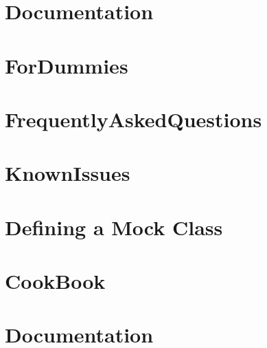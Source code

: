 \documentclass[twoside]{book}
\newcommand{\+}{\discretionary{\mbox{\scriptsize$\hookleftarrow$}}{}{}}
\begin{document}
\chapter{Documentation}
\label{md_vendor_googletest_googlemock_docs__documentation}

\chapter{For\+Dummies}
\label{md_vendor_googletest_googlemock_docs__for_dummies}

\chapter{Frequently\+Asked\+Questions}
\label{md_vendor_googletest_googlemock_docs__frequently_asked_questions}

\chapter{Known\+Issues}
\label{md_vendor_googletest_googlemock_docs__known_issues}

\chapter{Defining a Mock Class}
\label{md_vendor_googletest_googlemock_docs_v1_5__cheat_sheet}

\chapter{Cook\+Book}
\label{md_vendor_googletest_googlemock_docs_v1_5__cook_book}

\chapter{Documentation}
\label{md_vendor_googletest_googlemock_docs_v1_5__documentation}

\end{document}
